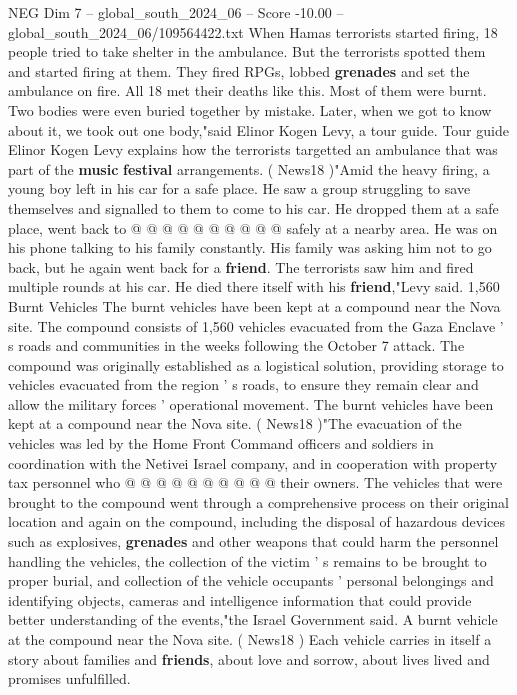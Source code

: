 \begin{textsample}{NEG Dim 7 – global\_south\_2024\_06 – Score -10.00 – global\_south\_2024\_06/109564422.txt}
When Hamas terrorists started firing, 18 people tried to take shelter in the ambulance.
But the terrorists spotted them and started firing at them.
They fired RPGs, lobbed \textbf{grenades} and set the ambulance on fire.
All 18 met their deaths like this.
Most of them were burnt.
Two bodies were even buried together by mistake.
Later, when we got to know about it, we took out one body,"said Elinor Kogen Levy, a tour guide.
Tour guide Elinor Kogen Levy explains how the terrorists targetted an ambulance that was part of the \textbf{music} \textbf{festival} arrangements. ( News18 )"Amid the heavy firing, a young boy left in his car for a safe place.
He saw a group struggling to save themselves and signalled to them to come to his car.
He dropped them at a safe place, went back to @ @ @ @ @ @ @ @ @ @ safely at a nearby area.
He was on his phone talking to his family constantly.
His family was asking him not to go back, but he again went back for a \textbf{friend}.
The terrorists saw him and fired multiple rounds at his car.
He died there itself with his \textbf{friend},"Levy said. 1,560 Burnt Vehicles The burnt vehicles have been kept at a compound near the Nova site.
The compound consists of 1,560 vehicles evacuated from the Gaza Enclave ' s roads and communities in the weeks following the October 7 attack.
The compound was originally established as a logistical solution, providing storage to vehicles evacuated from the region ' s roads, to ensure they remain clear and allow the military forces ' operational movement.
The burnt vehicles have been kept at a compound near the Nova site. ( News18 )"The evacuation of the vehicles was led by the Home Front Command officers and soldiers in coordination with the Netivei Israel company, and in cooperation with property tax personnel who @ @ @ @ @ @ @ @ @ @ their owners.
The vehicles that were brought to the compound went through a comprehensive process on their original location and again on the compound, including the disposal of hazardous devices such as explosives, \textbf{grenades} and other weapons that could harm the personnel handling the vehicles, the collection of the victim ' s remains to be brought to proper burial, and collection of the vehicle occupants ' personal belongings and identifying objects, cameras and intelligence information that could provide better understanding of the events,"the Israel Government said.
A burnt vehicle at the compound near the Nova site. ( News18 ) Each vehicle carries in itself a story about families and \textbf{friends}, about love and sorrow, about lives lived and promises unfulfilled.

\end{textsample}
